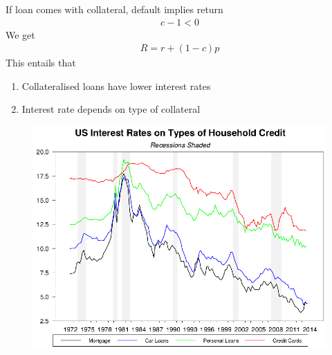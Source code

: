 \documentclass{beamer}
\begin{document}
\begin{frame}
 If loan comes with collateral, default implies return
\begin{align}
  c-1<0  
\end{align}
We get
\begin{align}
  R=r+(1-c)p  
\end{align}
 \medskip
 This entails that
 \begin{enumerate}
   \item Collateralised loans have lower interest rates
   \item Interest rate depends on type of collateral
 \end{enumerate}
\end{frame}

\begin{frame}
  \begin{figure}
    \includegraphics{us_interest_rates.eps}
  \end{figure}
\end{frame}
\end{document}
